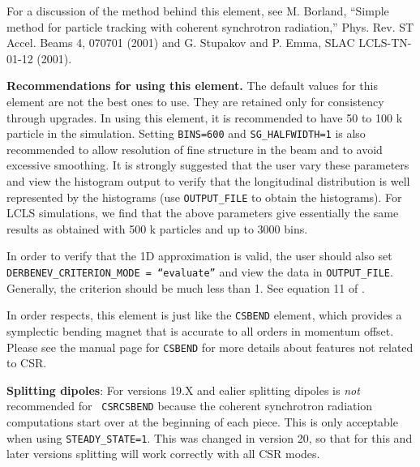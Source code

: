 For a discussion of the method behind this element, see M. Borland,
``Simple method for particle tracking with coherent synchrotron
radiation,'' Phys. Rev. ST Accel. Beams 4, 070701 (2001) and
G. Stupakov and P. Emma, SLAC LCLS-TN-01-12 (2001).

{\bf Recommendations for using this element.}  The default values for
this element are not the best ones to use.  They are retained only for
consistency through upgrades.  In using this element, it is
recommended to have 50 to 100 k particle in the simulation.  Setting
{\tt BINS=600} and {\tt SG\_HALFWIDTH=1} is also recommended to allow
resolution of fine structure in the beam and to avoid excessive
smoothing.  It is strongly suggested that the user vary these
parameters and view the histogram output to verify that the
longitudinal distribution is well represented by the histograms (use
{\tt OUTPUT\_FILE} to obtain the histograms).  For LCLS simulations,
we find that the above parameters give essentially the same results as
obtained with 500 k particles and up to 3000 bins.

In order to verify that the 1D approximation is valid, the user should
also set {\tt DERBENEV\_CRITERION\_MODE = ``evaluate''} and view
the data in {\tt OUTPUT\_FILE}.  Generally, the criterion should be
much less than 1.  See equation 11 of \cite{Derbenev}.

In order respects, this element is just like the {\tt CSBEND} element,
which provides a symplectic bending magnet that is accurate to all
orders in momentum offset. Please see the manual page for {\tt CSBEND}
for more details about features not related to CSR.

{\bf Splitting dipoles}: 
For versions 19.X and ealier splitting dipoles is {\em not} recommended for {\tt
CSRCSBEND} because the coherent synchrotron radiation computations
start over at the beginning of each piece.  This is only acceptable
when using \verb|STEADY_STATE=1|.  This was changed in version 20, so that
for this and later versions splitting will work correctly with all CSR modes.

